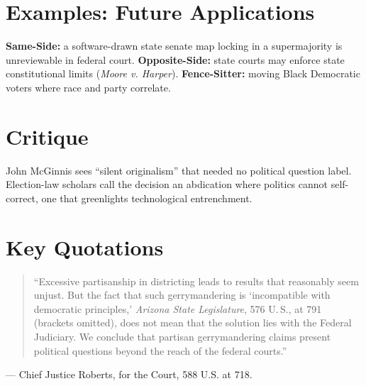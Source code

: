 \documentclass[12pt]{article}
\begin{document}
\section{Examples: Future Applications}
\textbf{Same-Side:} a software-drawn state senate map locking in a supermajority is unreviewable in federal court. \textbf{Opposite-Side:} state courts may enforce state constitutional limits (\textit{Moore v. Harper}). \textbf{Fence-Sitter:} moving Black Democratic voters where race and party correlate.

\section{Critique}
John McGinnis sees ``silent originalism'' that needed no political question label. Election-law scholars call the decision an abdication where politics cannot self-correct, one that greenlights technological entrenchment.

\section{Key Quotations}
\begin{quote}
``Excessive partisanship in districting leads to results that reasonably seem unjust. But the fact that such gerrymandering is `incompatible with democratic principles,' \textit{Arizona State Legislature}, 576 U.\,S., at 791 (brackets omitted), does not mean that the solution lies with the Federal Judiciary. We conclude that partisan gerrymandering claims present political questions beyond the reach of the federal courts.''
\end{quote}
\noindent --- Chief Justice Roberts, for the Court, 588 U.S. at 718.
\end{document}
